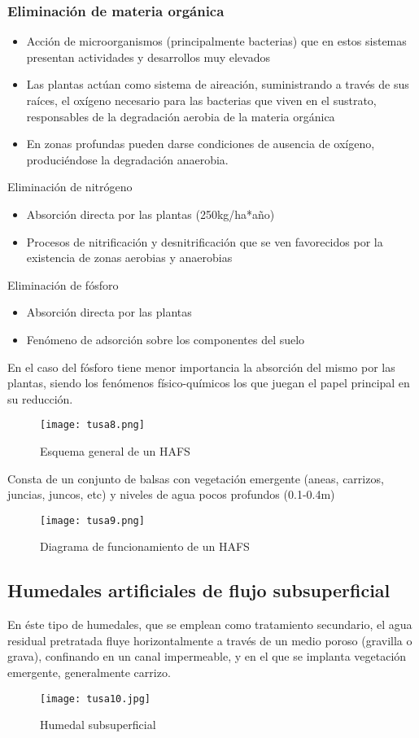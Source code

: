 \subsubsection{Eliminación de materia orgánica}
\begin{itemize}
    \item Acción de microorganismos (principalmente bacterias) que en estos sistemas presentan actividades y desarrollos muy elevados
    \item Las plantas actúan como sistema de aireación, suministrando a través de sus raíces, el oxígeno necesario para las bacterias que viven en el sustrato, responsables de la degradación aerobia de la materia orgánica
    \item En zonas profundas pueden darse condiciones de ausencia de oxígeno, produciéndose la degradación anaerobia.
\end{itemize}
Eliminación de nitrógeno
\begin{itemize}
    \item Absorción directa por las plantas (250kg/ha*año)
    \item Procesos de nitrificación y desnitrificación que se ven favorecidos por la existencia de zonas aerobias y anaerobias
\end{itemize}
Eliminación de fósforo
\begin{itemize}
    \item Absorción directa por las plantas
    \item Fenómeno de adsorción sobre los componentes del suelo
\end{itemize}
En el caso del fósforo tiene menor importancia la absorción del mismo por las plantas, siendo los fenómenos físico-químicos los que juegan el papel principal en su reducción.
\begin{figure}[h!]
\centering
  \texttt{[image: tusa8.png]}
  \caption{Esquema general de un HAFS}
  \label{tusa8}
\end{figure}
Consta de un conjunto de balsas con vegetación emergente (aneas, carrizos, juncias, juncos, etc) y niveles de agua pocos profundos (0.1-0.4m)
\begin{figure}[h!]
    \centering
      \texttt{[image: tusa9.png]}
      \caption{Diagrama de funcionamiento de un HAFS}
      \label{tusa9}
\end{figure}
\subsection{Humedales artificiales de flujo subsuperficial}
En éste tipo de humedales, que se emplean como tratamiento secundario, el agua residual pretratada fluye horizontalmente a través de un medio poroso (gravilla o grava), confinando en un canal impermeable, y en el que se implanta vegetación emergente, generalmente carrizo.
\begin{figure}[h!]
    \centering
      \texttt{[image: tusa10.jpg]}
      \caption{Humedal subsuperficial}
      \label{tusa10}
\end{figure}
